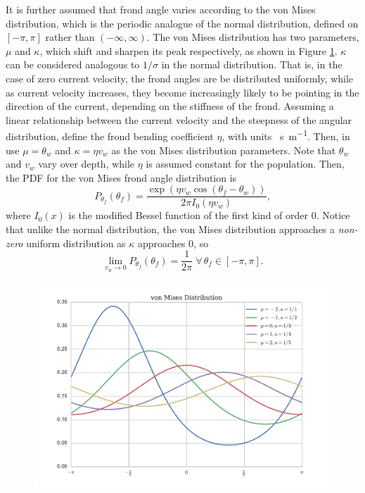 \documentclass[ms,cpyr,lof,lot]{uathesis}
\begin{document}
It is further assumed that frond angle varies according to the von Mises distribution, which is the periodic analogue of the normal distribution, defined on $[-\pi,\pi]$ rather than $(-\infty,\infty)$.
The von Mises distribution has two parameters, $\mu$ and $\kappa$, which shift and sharpen its peak respectively, as shown in Figure \ref{fig:vonmises}.
$\kappa$ can be considered analogous to $1/\sigma$ in the normal distribution.
That is, in the case of zero current velocity, the frond angles are be distributed uniformly, while as current velocity increases, they become increasingly likely to be pointing in the direction of the current, depending on the stiffness of the frond.
Assuming a linear relationship between the current velocity and the steepness of the angular distribution, define the frond bending coefficient $\eta$, with units \SI{}{\s\per\m}.
Then, in use $\mu = \theta_w$ and $\kappa = \eta v_w$ as the von Mises distribution parameters.
Note that $\theta_w$ and $v_w$ vary over depth, while $\eta$ is assumed constant for the population.
Then, the PDF for the von Mises frond angle distribution is
\begin{equation*}
	P_{\theta_f}(\theta_f) = \frac{\exp\left(\eta v_w\cos(\theta_f-\theta_w)\right)}{2\pi I_0(\eta v_w)},
\end{equation*}
where $I_0(x)$ is the modified Bessel function of the first kind of order 0.
Notice that unlike the normal distribution, the von Mises distribution approaches a \textit{non-zero} uniform distribution as $\kappa$ approaches 0, so
\begin{equation*}
	\displaystyle \lim_{v_w \to 0}P_{\theta_f}(\theta_f) = \frac{1}{2\pi} \;\forall\, \theta_f \in [-\pi,\pi].
\end{equation*}

\begin{figure}[h]
	\centering
	\includegraphics[width=.75\linewidth]{vonmises_2}
	\label{fig:vonmises}
\end{figure}
\end{document}
